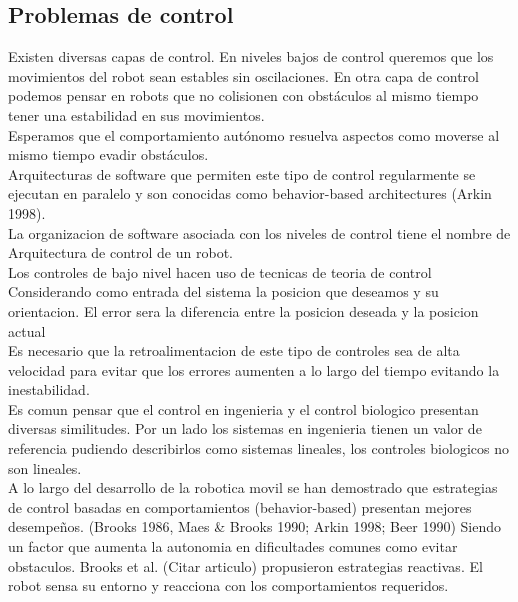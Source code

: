 \documentclass[11pt,epsf,times]{article}
\begin{document}
\subsection*{Problemas de control}
  
  Existen diversas capas de control. En niveles bajos de control queremos que los movimientos del robot sean estables sin oscilaciones. En otra capa de control podemos pensar en robots que no colisionen con obst\'{a}culos al mismo tiempo tener una estabilidad en sus movimientos.\\
  Esperamos que el comportamiento aut\'{o}nomo resuelva aspectos como moverse al mismo tiempo evadir obst\'{a}culos.\\
  Arquitecturas de software que permiten este tipo de control regularmente se ejecutan en paralelo y son conocidas como behavior-based architectures (Arkin 1998).\\
  
  La organizacion de software asociada con los niveles de control tiene el nombre de Arquitectura de control de un robot.\\
  
  Los controles de bajo nivel hacen uso de tecnicas de teoria de control \cite{ramirez2001}\\
  Considerando como entrada del sistema la posicion que deseamos y su orientacion. El error sera la diferencia entre la posicion deseada y la posicion actual\\
  
  Es necesario que la retroalimentacion de este tipo de controles sea de alta velocidad para evitar que los errores aumenten a lo largo del tiempo evitando la inestabilidad.\\
  
  Es comun pensar que el control en ingenieria y el control biologico presentan diversas similitudes. Por un lado los sistemas en ingenieria tienen un valor de referencia pudiendo describirlos como sistemas lineales, los controles biologicos no son lineales.\\
  
  A lo largo del desarrollo de la robotica movil se han demostrado que estrategias de control basadas en comportamientos (behavior-based) presentan mejores desempe\~{n}os. (Brooks 1986, Maes \& Brooks 1990; Arkin 1998; Beer 1990) Siendo un factor que aumenta la autonomia en dificultades comunes como evitar obstaculos. Brooks et al. (Citar articulo) propusieron estrategias reactivas. El robot sensa su entorno y reacciona con los comportamientos requeridos.
  
\end{document}
